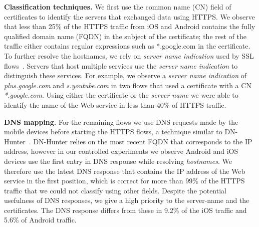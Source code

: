 \noindent\textbf{Classification techniques.} We first use the common name (CN) field of certificates to identify the servers that exchanged data using HTTPS.
We observe that less than 25\% of the HTTPS traffic from iOS and Android contains the fully qualified domain name (FQDN) in the subject of the certificate; the rest of the traffic either contains regular expressions such as *.google.com in the certificate.
To further resolve the hostnames, we rely on \emph{server name indication} used by SSL flows~\cite{rfc:servernametls}.
Servers that host multiple services use the \emph{server name indication} to distinguish these services.   
For example, we observe a \emph{server name indication} of \emph{plus.google.com} and \emph{s.youtube.com} in two flows that used a certificate with a CN \emph{*.google.com}.
Using either the certificate or the \emph{server name} we were able to identify the name of the Web service in less than 40\% of HTTPS traffic.

\noindent\textbf{DNS mapping.} For the remaining flows we use DNS requests made by the mobile devices before starting the HTTPS flows, a technique similar to DN-Hunter~\cite{bermudez:dnhunter}.
DN-Hunter relies on the most recent FQDN that corresponds to the IP address, however in our controlled experiments we observe Android and iOS devices use the first entry in DNS response while resolving \emph{hostnames}.
We therefore use the latest DNS response that contains the IP address of the Web service in the first position, which is correct 
for more than 99\% of the HTTPS traffic that we could not classify using other fields. 
Despite the potential usefulness of DNS responses, we give a high priority to the server-name and the certificates. The DNS response differs from these in 9.2\% of the iOS traffic and 5.6\% of Android traffic.


